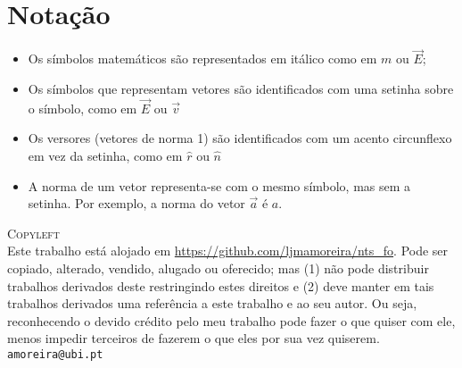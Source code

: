 \section*{Notação}
\begin{itemize}
\item
    Os símbolos matemáticos são representados em itálico como em $m$ ou $\vec
    E$;
\item
    Os símbolos que representam vetores são identificados com uma setinha sobre
    o símbolo, como em $\vec E$ ou $\vec v$
\item
    Os versores (vetores de norma 1) são identificados com um acento circunflexo
    em vez da setinha, como em $\hat r$ ou $\hat n$
\item
    A norma de um vetor representa-se com o mesmo símbolo, mas sem a setinha.
    Por exemplo, a norma do vetor $\vec a$ é $a$. 
\end{itemize}

\vfill
\noindent
{\small
\textsc{Copyleft}\\
Este trabalho está alojado em \url{https://github.com/ljmamoreira/nts_fo}.  Pode
ser copiado, alterado, vendido, alugado ou oferecido; mas (1) não pode
distribuir trabalhos derivados deste restringindo estes direitos e (2) deve
manter em tais trabalhos derivados uma referência a este trabalho e ao seu
autor. Ou seja, reconhecendo o devido crédito pelo meu trabalho pode fazer o que
quiser com ele, menos impedir terceiros de fazerem o que eles por sua vez
quiserem.\\
\texttt{amoreira@ubi.pt}
}

\pagebreak
\tableofcontents
